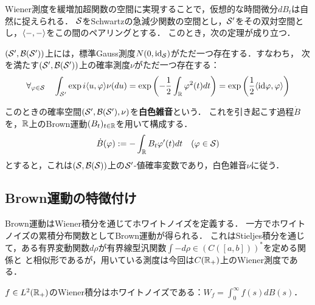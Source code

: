 \documentclass[uplatex,dvipdfmx]{jsreport}
\begin{document}
\begin{discussion}
    Wiener測度を緩増加超関数の空間に実現することで，仮想的な時間微分$dB_t$は自然に捉えられる．
    $\S$をSchwartzの急減少関数の空間とし，$\S'$をその双対空間とし，$\brac{-,-}$をこの間のペアリングとする．
    このとき，次の定理が成り立つ．
    \begin{theorem}[白色雑音の存在定理]\label{thm-existence-of-white-noise}
        $(\S',\B(\S'))$上には，標準Gauss測度$N(0,\id_{\S})$がただ一つ存在する．すなわち，
        次を満たす$(\S',\B(\S'))$上の確率測度$\nu$がただ一つ存在する：
        \[\forall_{\varphi\in\S}\quad\int_{\S'}\exp{i\brac{u,\varphi}}\nu(du)=\exp\paren{-\frac{1}{2}\int_\R\varphi^2(t)dt}=\exp\paren{\frac{1}{2}\brac{\id\varphi,\varphi}}\]
    \end{theorem}
    このときの確率空間$(\S',\B(\S'),\nu)$を\textbf{白色雑音}という．
    これを引き起こす過程$\dot{B}$を，$\R$上のBrown運動$(B_t)_{t\in\R}$を用いて構成する．
    \[\dot{B}(\varphi):=-\int_\R B_t\varphi'(t)dt\quad(\varphi\in\S)\]
    とすると，これは$(\S,\B(\S))$上の$\S'$-値確率変数であり，白色雑音$\nu$に従う．
\end{discussion}

\subsection{Brown運動の特徴付け}

\begin{tcolorbox}[colframe=ForestGreen, colback=ForestGreen!10!white,breakable,colbacktitle=ForestGreen!40!white,coltitle=black,fonttitle=\bfseries\sffamily,
title=]
    Brown運動はWiener積分を通じてホワイトノイズを定義する．
    一方でホワイトノイズの累積分布関数としてBrown運動が得られる．
    これはStieljes積分を通じて，ある有界変動関数$d\rho$が有界線型汎関数$\int-d\rho\in (C([a,b]))^*$を定める関係と
    と相似形であるが，用いている測度は今回は$C(\R_+)$上のWiener測度である．
\end{tcolorbox}

\begin{proposition}
    $f\in L^2(\R_+)$のWiener積分はホワイトノイズである：$W_f=\int^\infty_0f(s)dB(s)$．
\end{proposition}
\end{document}
